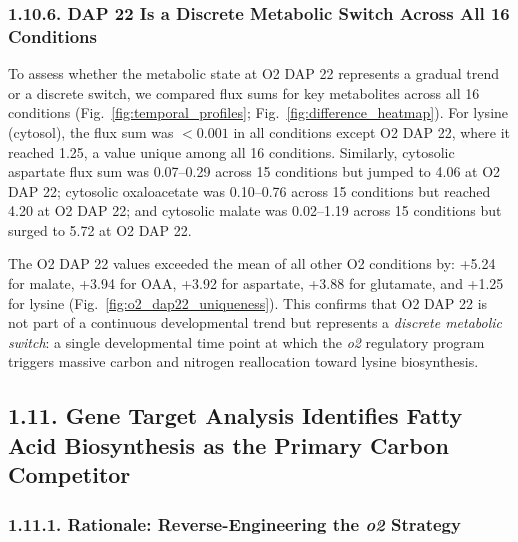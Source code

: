 \documentclass[12pt,a4paper]{article}
\begin{document}
\subsubsection{1.10.6. DAP 22 Is a Discrete Metabolic Switch Across All 16 Conditions}

To assess whether the metabolic state at O2 DAP 22 represents a gradual trend or a discrete switch, we compared flux sums for key metabolites across all 16 conditions (Fig.~\ref{fig:temporal_profiles}; Fig.~\ref{fig:difference_heatmap}). For lysine (cytosol), the flux sum was $<0.001$ in all conditions except O2 DAP 22, where it reached 1.25, a value unique among all 16 conditions. Similarly, cytosolic aspartate flux sum was 0.07--0.29 across 15 conditions but jumped to 4.06 at O2 DAP 22; cytosolic oxaloacetate was 0.10--0.76 across 15 conditions but reached 4.20 at O2 DAP 22; and cytosolic malate was 0.02--1.19 across 15 conditions but surged to 5.72 at O2 DAP 22.

The O2 DAP 22 values exceeded the mean of all other O2 conditions by: +5.24 for malate, +3.94 for OAA, +3.92 for aspartate, +3.88 for glutamate, and +1.25 for lysine (Fig.~\ref{fig:o2_dap22_uniqueness}). This confirms that O2 DAP 22 is not part of a continuous developmental trend but represents a \textit{discrete metabolic switch}: a single developmental time point at which the \textit{o2} regulatory program triggers massive carbon and nitrogen reallocation toward lysine biosynthesis.

\subsection{1.11. Gene Target Analysis Identifies Fatty Acid Biosynthesis as the Primary Carbon Competitor}

\subsubsection{1.11.1. Rationale: Reverse-Engineering the \textit{o2} Strategy}
\end{document}
